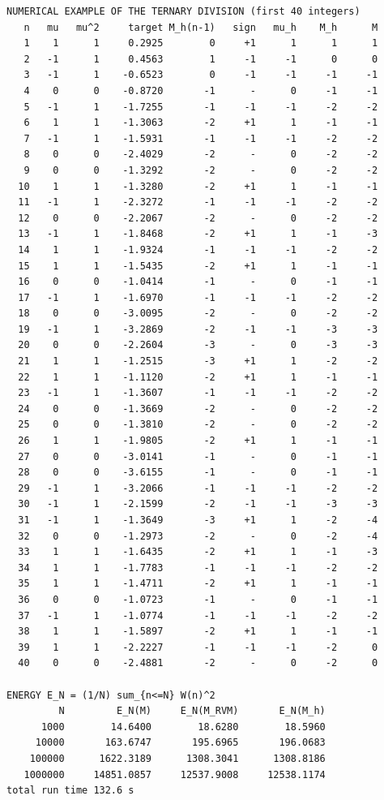 \documentclass[11pt,reqno]{amsart}
\numberwithin{equation}{section}
\theoremstyle{plain}
\theoremstyle{definition}
\theoremstyle{remark}
\begin{document}
\begin{lstlisting}[style=out]
NUMERICAL EXAMPLE OF THE TERNARY DIVISION (first 40 integers)
   n   mu   mu^2     target M_h(n-1)   sign   mu_h    M_h      M
   1    1      1     0.2925        0     +1      1      1      1
   2   -1      1     0.4563        1     -1     -1      0      0
   3   -1      1    -0.6523        0     -1     -1     -1     -1
   4    0      0    -0.8720       -1      -      0     -1     -1
   5   -1      1    -1.7255       -1     -1     -1     -2     -2
   6    1      1    -1.3063       -2     +1      1     -1     -1
   7   -1      1    -1.5931       -1     -1     -1     -2     -2
   8    0      0    -2.4029       -2      -      0     -2     -2
   9    0      0    -1.3292       -2      -      0     -2     -2
  10    1      1    -1.3280       -2     +1      1     -1     -1
  11   -1      1    -2.3272       -1     -1     -1     -2     -2
  12    0      0    -2.2067       -2      -      0     -2     -2
  13   -1      1    -1.8468       -2     +1      1     -1     -3
  14    1      1    -1.9324       -1     -1     -1     -2     -2
  15    1      1    -1.5435       -2     +1      1     -1     -1
  16    0      0    -1.0414       -1      -      0     -1     -1
  17   -1      1    -1.6970       -1     -1     -1     -2     -2
  18    0      0    -3.0095       -2      -      0     -2     -2
  19   -1      1    -3.2869       -2     -1     -1     -3     -3
  20    0      0    -2.2604       -3      -      0     -3     -3
  21    1      1    -1.2515       -3     +1      1     -2     -2
  22    1      1    -1.1120       -2     +1      1     -1     -1
  23   -1      1    -1.3607       -1     -1     -1     -2     -2
  24    0      0    -1.3669       -2      -      0     -2     -2
  25    0      0    -1.3810       -2      -      0     -2     -2
  26    1      1    -1.9805       -2     +1      1     -1     -1
  27    0      0    -3.0141       -1      -      0     -1     -1
  28    0      0    -3.6155       -1      -      0     -1     -1
  29   -1      1    -3.2066       -1     -1     -1     -2     -2
  30   -1      1    -2.1599       -2     -1     -1     -3     -3
  31   -1      1    -1.3649       -3     +1      1     -2     -4
  32    0      0    -1.2973       -2      -      0     -2     -4
  33    1      1    -1.6435       -2     +1      1     -1     -3
  34    1      1    -1.7783       -1     -1     -1     -2     -2
  35    1      1    -1.4711       -2     +1      1     -1     -1
  36    0      0    -1.0723       -1      -      0     -1     -1
  37   -1      1    -1.0774       -1     -1     -1     -2     -2
  38    1      1    -1.5897       -2     +1      1     -1     -1
  39    1      1    -2.2227       -1     -1     -1     -2      0
  40    0      0    -2.4881       -2      -      0     -2      0

ENERGY E_N = (1/N) sum_{n<=N} W(n)^2
         N         E_N(M)     E_N(M_RVM)       E_N(M_h)
      1000        14.6400        18.6280        18.5960
     10000       163.6747       195.6965       196.0683
    100000      1622.3189      1308.3041      1308.8186
   1000000     14851.0857     12537.9008     12538.1174
total run time 132.6 s
\end{lstlisting}
\end{document}
